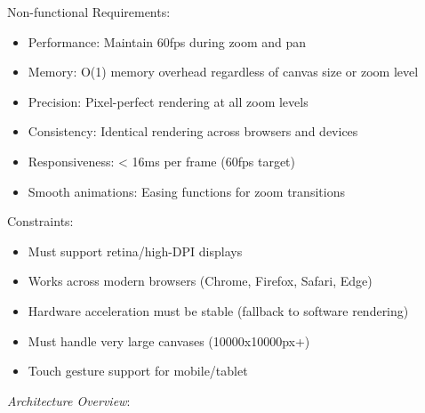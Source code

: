 \documentclass[11pt]{article}
\begin{document}
Non-functional Requirements:

\begin{itemize}
\item Performance: Maintain 60fps during zoom and pan
\item Memory: O(1) memory overhead regardless of canvas size or zoom level
\item Precision: Pixel-perfect rendering at all zoom levels
\item Consistency: Identical rendering across browsers and devices
\item Responsiveness: < 16ms per frame (60fps target)
\item Smooth animations: Easing functions for zoom transitions
\end{itemize}

Constraints:

\begin{itemize}
\item Must support retina/high-DPI displays
\item Works across modern browsers (Chrome, Firefox, Safari, Edge)
\item Hardware acceleration must be stable (fallback to software rendering)
\item Must handle very large canvases (10000x10000px+)
\item Touch gesture support for mobile/tablet
\end{itemize}

\emph{Architecture Overview}:
\end{document}
